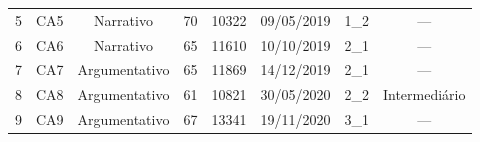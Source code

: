 \documentclass[portuguese]{textolivre}
\begin{document}
\begin{table}[h]
\begin{threeparttable}
\begin{tabular}{cccccccc}
5                   & CA5                                                               & Narrativo                                                   & 70                                                            & 10322                                                           & 09/05/2019                                                   & 1\_2                                                                                      & ---                                                                           \\
6                   & CA6                                                               & Narrativo                                                   & 65                                                            & 11610                                                           & 10/10/2019                                                   & 2\_1                                                                                      & ---                                                                           \\
7                   & CA7                                                               & Argumentativo                                               & 65                                                            & 11869                                                           & 14/12/2019                                                   & 2\_1                                                                                      & ---                                                                           \\
8                   & CA8                                                               & Argumentativo                                               & 61                                                            & 10821                                                           & 30/05/2020                                                   & 2\_2                                                                                      & \parbox[t]{1.4cm}{Intermediário}                                                                 \\
9                   & CA9                                                               & Argumentativo                                               & 67                                                            & 13341                                                           & 19/11/2020                                                   & 3\_1                                                                                      & ---                                                                           \\ 

\end{tabular}
\end{threeparttable}
\end{table}
\end{document}
